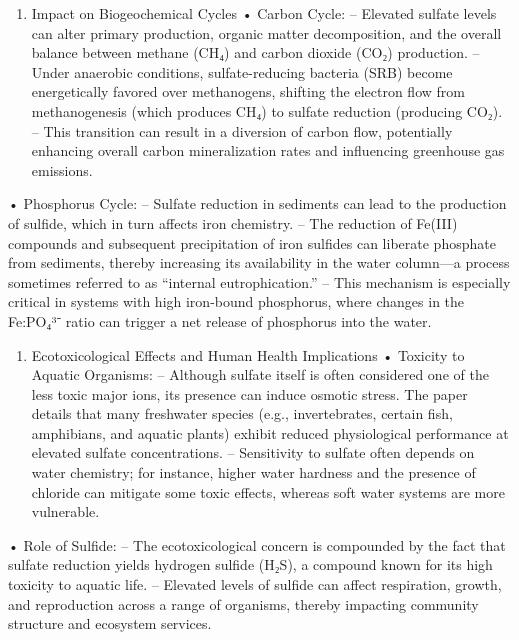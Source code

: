 \documentclass[12pt,twoside]{book}
\providecommand{\tightlist}{%
  \setlength{\itemsep}{0pt}\setlength{\parskip}{0pt}}
\begin{document}
\begin{enumerate}
\def\labelenumi{\arabic{enumi}.}
\setcounter{enumi}{2}
\tightlist
\item
  Impact on Biogeochemical Cycles
  • Carbon Cycle:
  -- Elevated sulfate levels can alter primary production, organic matter decomposition, and the overall balance between methane (CH₄) and carbon dioxide (CO₂) production.
  -- Under anaerobic conditions, sulfate-reducing bacteria (SRB) become energetically favored over methanogens, shifting the electron flow from methanogenesis (which produces CH₄) to sulfate reduction (producing CO₂).
  -- This transition can result in a diversion of carbon flow, potentially enhancing overall carbon mineralization rates and influencing greenhouse gas emissions.
\end{enumerate}

• Phosphorus Cycle:
-- Sulfate reduction in sediments can lead to the production of sulfide, which in turn affects iron chemistry.
-- The reduction of Fe(III) compounds and subsequent precipitation of iron sulfides can liberate phosphate from sediments, thereby increasing its availability in the water column---a process sometimes referred to as ``internal eutrophication.''
-- This mechanism is especially critical in systems with high iron-bound phosphorus, where changes in the Fe:PO₄³⁻ ratio can trigger a net release of phosphorus into the water.

\begin{enumerate}
\def\labelenumi{\arabic{enumi}.}
\setcounter{enumi}{3}
\tightlist
\item
  Ecotoxicological Effects and Human Health Implications
  • Toxicity to Aquatic Organisms:
  -- Although sulfate itself is often considered one of the less toxic major ions, its presence can induce osmotic stress. The paper details that many freshwater species (e.g., invertebrates, certain fish, amphibians, and aquatic plants) exhibit reduced physiological performance at elevated sulfate concentrations.
  -- Sensitivity to sulfate often depends on water chemistry; for instance, higher water hardness and the presence of chloride can mitigate some toxic effects, whereas soft water systems are more vulnerable.
\end{enumerate}

• Role of Sulfide:
-- The ecotoxicological concern is compounded by the fact that sulfate reduction yields hydrogen sulfide (H₂S), a compound known for its high toxicity to aquatic life.
-- Elevated levels of sulfide can affect respiration, growth, and reproduction across a range of organisms, thereby impacting community structure and ecosystem services.
\end{document}
